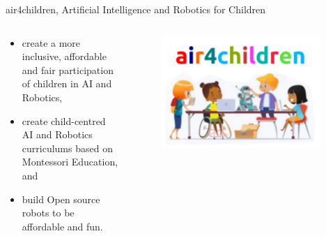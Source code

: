 {
\begin{frame}{
air4children, Artificial Intelligence and Robotics for Children
}
 
  \begin{columns}
  \begin{column}{.7\linewidth}

  \begin{itemize}
    \item create a more inclusive, affordable and fair participation of children in AI and Robotics,
    \item create child-centred AI and Robotics curriculums based on Montessori Education, and
    \item build Open source robots to be affordable and fun. 
  \end{itemize}

    \end{column}


  \begin{column}{.4\linewidth}

      \begin{figure}
        \centering
        \includegraphics[width=0.95\textwidth]{./figures/logo/outputs/drawing-v00.png}
      \end{figure}

    \end{column}
  \end{columns}

\end{frame}
}




